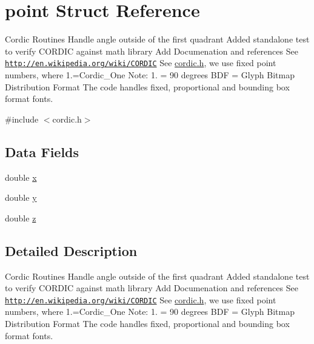 \hypertarget{structpoint}{\section{point Struct Reference}
\label{structpoint}
}


Cordic Routines Handle angle outside of the first quadrant Added standalone test to verify C\-O\-R\-D\-I\-C against math library Add Documenation and references See \href{http://en.wikipedia.org/wiki/CORDIC}{\tt http\-://en.\-wikipedia.\-org/wiki/\-C\-O\-R\-D\-I\-C} See \hyperlink{cordic_8h}{cordic.\-h}, we use fixed point numbers, where 1.=Cordic\-\_\-\-One Note\-: 1. = 90 degrees B\-D\-F = Glyph Bitmap Distribution Format The code handles fixed, proportional and bounding box format fonts.  




{\ttfamily \#include $<$cordic.\-h$>$}

\subsection*{Data Fields}
\begin{DoxyCompactItemize}
\item 
double \hyperlink{structpoint_a9c6b34deaf4900ad4193c17935fd384a}{x}
\item 
double \hyperlink{structpoint_a613f8f0d7352731638b0094e1b958b87}{y}
\item 
double \hyperlink{structpoint_aab1f0c3682401083b5bf252e7001874f}{z}
\end{DoxyCompactItemize}


\subsection{Detailed Description}
Cordic Routines Handle angle outside of the first quadrant Added standalone test to verify C\-O\-R\-D\-I\-C against math library Add Documenation and references See \href{http://en.wikipedia.org/wiki/CORDIC}{\tt http\-://en.\-wikipedia.\-org/wiki/\-C\-O\-R\-D\-I\-C} See \hyperlink{cordic_8h}{cordic.\-h}, we use fixed point numbers, where 1.=Cordic\-\_\-\-One Note\-: 1. = 90 degrees B\-D\-F = Glyph Bitmap Distribution Format The code handles fixed, proportional and bounding box format fonts. 

